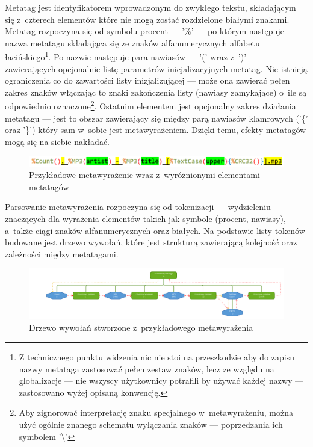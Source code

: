 \par
Metatag jest identyfikatorem wprowadzonym do zwykłego tekstu, składającym się z~czterech elementów które nie mogą zostać rozdzielone białymi znakami. Metatag rozpoczyna się od symbolu procent --- '\%' --- po którym następuje nazwa metatagu składająca się ze znaków alfanumerycznych alfabetu łacińskiego\footnote{Z technicznego punktu widzenia nic nie stoi na przeszkodzie aby do zapisu nazwy metataga zastosować pełen zestaw znaków, lecz ze względu na globalizacje --- nie wszyscy użytkownicy potrafili by używać każdej nazwy --- zastosowano wyżej opisaną konwencję.}.
Po nazwie następuje para nawiasów --- '(' wraz z~')' --- zawierających opcjonalnie listę parametrów inicjalizacyjnych metatag. Nie istnieją ograniczenia co do zawartości listy inizjalizującej --- może ona zawierać pełen zakres znaków włączając to znaki zakończenia listy (nawiasy zamykające) o~ile są odpowiednio oznaczone\footnote{Aby zignorować interpretację znaku specjalnego w~metawyrażeniu, można użyć ogólnie znanego schematu wyłączania znaków --- poprzedzania ich symbolem '\textbackslash'}.
Ostatnim elementem jest opcjonalny zakres działania metatagu --- jest to obszar zawierający się między parą nawiasów klamrowych ('\{' oraz '\}') który sam w~sobie jest metawyrażeniem. Dzięki temu, efekty metatagów mogą się na siebie nakładać.

\begin{figure}[h]
\begin{center}
\includegraphics[scale=0.55]{img/metatag_expr2.png}
\end{center}
\caption{Przykładowe metawyrażenie wraz z~wyróżnionymi elementami metatagów}
\label{metatag-expr}
\end{figure}

\par
Parsowanie metawyrażenia rozpoczyna się od tokenizacji --- wydzieleniu znaczących dla wyrażenia elementów takich jak symbole (procent, nawiasy), a~także ciągi znaków alfanumerycznych oraz białych. Na podstawie listy tokenów budowane jest drzewo wywołań, które jest strukturą zawierającą kolejność oraz zależności między metatagami.

\begin{figure}
\begin{center}
\includegraphics[scale=0.55]{img/metatag_expr_tree4.png}
\end{center}
\caption{Drzewo wywołań stworzone z~przykładowego metawyrażenia}
\label{metatag-expr-tree}
\end{figure}

